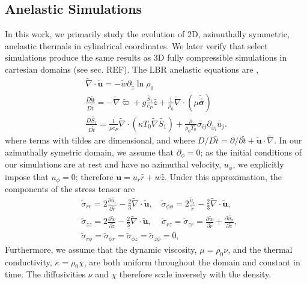 \documentclass[twocolumn, amsmath, amsfonts, amssymb, trackchanges]{aastex62}
\newcommand{\td}[1]{\ensuremath{\widetilde{#1}}}
\newcommand{\grad}{\ensuremath{\nabla}}
\newcommand{\lilstressT}{\ensuremath{\bm{\bar{\bar{\sigma}}}}}
\begin{document}
\subsection{Anelastic Simulations}
In this work, we primarily study the evolution of 2D, azimuthally symmetric, anelastic
thermals in cylindrical coordinates. 
We later verify that select simulations produce the same results as 3D fully compressible
simulations in cartesian domains (see sec. REF). 
The LBR anelastic equations are \citep{lecoanet&all2014},
\begin{gather}
\td{\grad}\cdot\td{\bm{u}} = -\td{w}\partial_{\tilde{z}} \ln\rho_0 
\label{eqn:AN_continuity_full}\\
\frac{D \td{\bm{u}}}{D \td{t}} = -\td{\grad} \td{\varpi} + g\frac{\td{S_1}}{c_P}\hat{z} + \frac{1}{\rho_0}\td{\grad}\cdot\left(\mu\td{\lilstressT}\right)
\label{eqn:AN_momentum_full}\\
\frac{D \td{S_1}}{D\td{t}} = \frac{1}{\rho c_P}\td{\grad}\cdot\left(\kappa T_0 \td{\grad} \td{S_1}\right) + \frac{\mu}{\rho_0 T_0}\td{\sigma_{ij}}\partial_{\td{x_i}}\td{u_j}
\label{eqn:AN_energy_full}.
\end{gather}
where terms with tildes are dimensional, and where
$D/D\td{t} = \partial/\partial \td{t} + \td{\bm{u}}\cdot\td{\grad}$. In our azimuthally symetric
domain, we assume that $\partial_\phi = 0$; as the initial conditions of our simulations are at rest and have
no azimuthal velocity, $u_\phi$, we explicitly impose that $u_\phi = 0$; therefore $\bm{u} = u_r \hat{r} + w\hat{z}$. 
Under this approximation, the components of the stress tensor are
\begin{equation}
\begin{split}
&\td{\sigma}_{rr} = 2\frac{\partial \td{u_r}}{\partial \td{r}} - \frac{2}{3}\td{\grad}\cdot\td{\bm{u}},\,\,\,\,\,\,
\td{\sigma}_{\phi\phi} = 2\frac{\td{u_r}}{\td{r}} - \frac{2}{3}\td{\grad}\cdot\td{\bm{u}}, \\
&\td{\sigma}_{zz}       = 2\frac{\partial \td{w}}{\partial \td{z}} - \frac{2}{3}\td{\grad}\cdot\td{\bm{u}},\,\,\,\,\,\,\,
\td{\sigma}_{rz}     = \td{\sigma}_{zr} = \frac{\partial \td{w}}{\partial \td{r}} + \frac{\partial \td{u_r}}{\partial \td{z}}, \\
&\td{\sigma}_{r\phi}  = \td{\sigma}_{\phi r}  
 = \td{\sigma}_{\phi z} = \td{\sigma}_{z \phi}  = 0,\qquad
\end{split}
\end{equation}
Furthermore, we assume that the dynamic viscosity, $\mu = \rho_0 \nu$, and the
thermal conductivity, $\kappa = \rho_0 \chi$, are both uniform throughout the domain and
constant in time.
The diffusivities $\nu$ and $\chi$ therefore scale inversely with the density.
\end{document}
